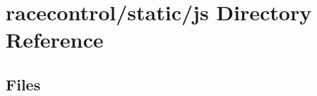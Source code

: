 \section{racecontrol/static/js Directory Reference}
\label{dir_44a67e48431935c7fc797e5990d787b8}
\subsection*{Files}
\begin{DoxyCompactItemize}
\end{DoxyCompactItemize}
